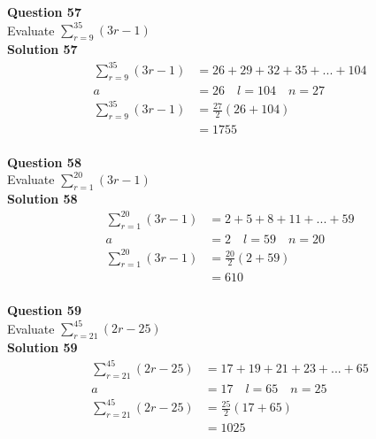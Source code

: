 \documentclass{article}
\begin{document}
\noindent\textbf{Question 57}\\[5pt]
Evaluate $\displaystyle\sum_{r=9}^{35} (3r-1)$\\[5pt]
\noindent\textbf{Solution 57}\\[5pt]
\begin{align*}
\displaystyle\sum_{r=9}^{35} (3r-1)&=26+29+32+35+...+104\\[2pt]
a&=26\quad l=104 \quad n=27\\[2pt]
\displaystyle\sum_{r=9}^{35} (3r-1)&=\displaystyle\frac{27}{2}(26+104)\\[2pt]
&=1755
\end{align*}\\[10pt]

\noindent\textbf{Question 58}\\[5pt]
Evaluate $\displaystyle\sum_{r=1}^{20} (3r-1)$\\[5pt]
\noindent\textbf{Solution 58}\\[5pt]
\begin{align*}
\displaystyle\sum_{r=1}^{20} (3r-1)&=2+5+8+11+...+59\\[2pt]
a&=2\quad l=59 \quad n=20\\[2pt]
\displaystyle\sum_{r=1}^{20} (3r-1)&=\displaystyle\frac{20}{2}(2+59)\\[2pt]
&=610
\end{align*}\\[10pt]

\noindent\textbf{Question 59}\\[5pt]
Evaluate $\displaystyle\sum_{r=21}^{45} (2r-25)$\\[5pt]
\noindent\textbf{Solution 59}\\[5pt]
\begin{align*}
\displaystyle\sum_{r=21}^{45} (2r-25)&=17+19+21+23+...+65\\[2pt]
a&=17\quad l=65 \quad n=25\\[2pt]
\displaystyle\sum_{r=21}^{45} (2r-25)&=\displaystyle\frac{25}{2}(17+65)\\[2pt]
&=1025
\end{align*}\\[10pt]
\end{document}
